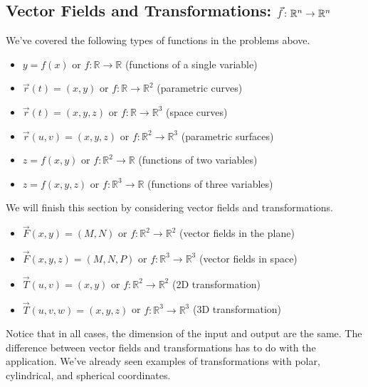 \subsection{Vector Fields and Transformations: $\vec f\colon \mathbb{R}^n\to\mathbb{R}^n$}

We've covered the following types of functions in the problems above.
\begin{itemize}
 \item $y=f(x)$ or $f\colon \mathbb{R}\to\mathbb{R}$ (functions of a single variable)
 \item $\vec r(t)=(x,y)$ or $f\colon \mathbb{R}\to\mathbb{R}^2$ (parametric curves)
 \item $\vec r(t)=(x,y,z)$ or $f\colon \mathbb{R}\to\mathbb{R}^3$ (space curves)
 \item $\vec r(u,v)=(x,y,z)$ or $f\colon \mathbb{R}^2\to\mathbb{R}^3$ (parametric surfaces)
 \item $z=f(x,y)$ or $f\colon \mathbb{R}^2\to\mathbb{R}$ (functions of two variables)
 \item $z=f(x,y,z)$ or $f\colon \mathbb{R}^3\to\mathbb{R}$ (functions of three variables)
\end{itemize}
We will finish this section by considering vector fields and transformations. 
\begin{itemize}
 \item $\vec F(x,y)=(M,N)$ or $f\colon \mathbb{R}^2\to\mathbb{R}^2$ (vector fields in the plane)
 \item $\vec F(x,y,z)=(M,N,P)$ or $f\colon \mathbb{R}^3\to\mathbb{R}^3$ (vector fields in space)
 \item $\vec T(u,v)=(x,y)$ or $f\colon \mathbb{R}^2\to\mathbb{R}^2$ (2D transformation)
 \item $\vec T(u,v,w)=(x,y,z)$ or $f\colon \mathbb{R}^3\to\mathbb{R}^3$ (3D transformation)
\end{itemize}
Notice that in all cases, the dimension of the input and output are the same. The difference between vector fields and transformations has to do with the application. We've already seen examples of transformations with polar, cylindrical, and spherical coordinates.

